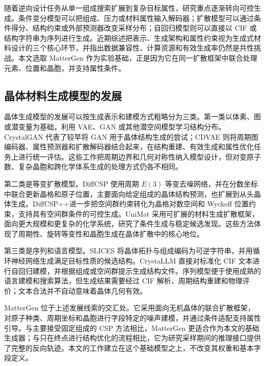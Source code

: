 随着逆向设计任务从单一组成搜索扩展到复杂目标属性，研究重点逐渐转向可控生成。条件变分模型可以把组成、压力或材料属性输入解码器；扩散模型可以通过条件得分、结构约束或外部预测器改变采样分布；自回归模型则可以直接以 CIF 或结构字符串为序列进行生成。近期综述把表示、生成架构和属性约束视为生成式材料设计的三个核心环节，并指出数据兼容性、计算资源和有效生成率仍然是共性挑战\citep{long2024}。本文选取 MatterGen 作为实验基础，正是因为它在同一扩散框架中联合处理元素、位置和晶胞，并支持属性条件。

\subsection{晶体材料生成模型的发展}

晶体生成模型的发展可以按生成表示和建模方式粗略分为三类。第一类以体素、图或潜变量为基础，利用 VAE、GAN 或其他潜空间模型学习结构分布。CrystalGAN 代表了较早将 GAN 用于晶体结构生成的尝试\citep{nouira2018}；CDVAE 则将周期图编码器、属性预测器和扩散解码器结合起来，在结构重建、有效生成和属性优化任务上进行统一评估\citep{xie2022}。这些工作把周期边界和几何对称性纳入模型设计，但对变原子数、复杂晶胞和跨化学体系生成的处理方式仍各不相同。

第二类是等变扩散模型。DiffCSP 使用周期 \(E(3)\) 等变去噪网络，并在分数坐标中联合更新晶格和原子位置，主要面向给定组成的晶体结构预测，也扩展到从头晶体生成\citep{jiao2023}。DiffCSP++进一步把空间群约束转化为晶格对数空间和 Wyckoff 位置约束，支持具有空间群条件的可控生成\citep{jiao2024}。UniMat 采用可扩展的材料生成扩散框架，面向更大规模和更复杂的化学系统，研究了条件生成与稳定候选发现\citep{yang2024}。这些方法体现了周期性、旋转等变性和晶胞生成在晶体扩散中的核心地位。

第三类是序列和语言模型。SLICES 将晶体拓扑与组成编码为可逆字符串，并用循环神经网络生成满足目标性质的候选结构\citep{xiao2023}。CrystaLLM 直接对标准化 CIF 文本进行自回归建模，并根据组成或空间群提示生成结构文件\citep{antunes2024}。序列模型便于使用成熟的语言建模和搜索算法，但生成结果需要经过 CIF 解析、周期结构重建和物理评价；文本合法并不自动意味着晶体几何有效。

MatterGen 位于上述发展线索的交汇处。它采用面向无机晶体的联合扩散框架，对原子种类、周期坐标和晶胞进行字段特定的噪声建模，并通过条件适配支持属性引导\citep{zeni2025}。与主要接受固定组成的 CSP 方法相比，MatterGen 更适合作为本文的基础生成器；与只在终点进行结构优化的流程相比，它为研究采样期间的推理接口提供了完整的反向轨迹。本文的工作建立在这个基础模型之上，不改变其权重和基本字段定义。


